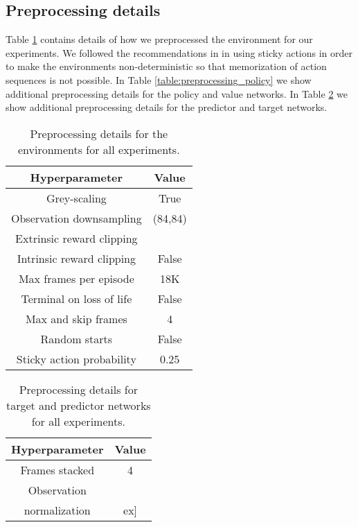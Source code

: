 \documentclass{article} \usepackage[dvipsnames]{xcolor}
\begin{document}
\subsection{Preprocessing details}
\label{sec:proprocessing}
Table \ref{table:preprocessing_env} contains details of how we preprocessed the environment for our experiments. We followed the recommendations in \cite{machado2017revisiting} in using sticky actions in order to make the environments non-deterministic so that memorization of action sequences is not possible. In Table \ref{table:preprocessing_policy} we show additional preprocessing details for the policy and value networks. In Table \ref{table:preprocessing_predictor} we show additional preprocessing details for the predictor and target networks.
\begin{table}[ht]
\centering
\begin{tabular}{c | c} 
 Hyperparameter & Value  \\ [0.5ex] 
 \hline
 Grey-scaling & True  \\ 
 Observation downsampling & (84,84)  \\
 Extrinsic reward clipping &   \\
 Intrinsic reward clipping & False  \\
 Max frames per episode & 18K \\
 Terminal on loss of life & False \\
 Max and skip frames & 4 \\
 Random starts & False \\
 Sticky action probability & 0.25 \\ [1ex] 
\end{tabular}
\caption{Preprocessing details for the environments for all experiments.}
\label{table:preprocessing_env}
\end{table}

\begin{table}
\begin{minipage}[t]{0.48\textwidth}
\centering
\begin{tabular}{c | c} 
 Hyperparameter & Value  \\ [0.5ex] 
 \hline
 Frames stacked & 4  \\
 Observation &  \\ 
 normalization &  \1ex] 
\end{tabular}
\caption{Preprocessing details for target and predictor networks for all experiments.}
\label{table:preprocessing_predictor}
\end{minipage}
\end{table}
\end{document}
